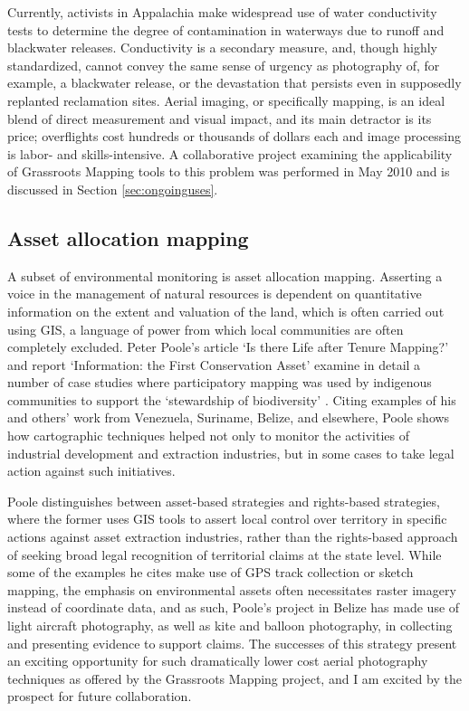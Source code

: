 \documentclass[11pt,oneside,notitlepage]{report}
\begin{document}
{{Currently, activists in Appalachia make widespread use of water conductivity tests to determine the degree of contamination in waterways due to runoff and blackwater releases. Conductivity is a secondary measure, and, though highly standardized, cannot convey the same sense of urgency as photography of, for example, a blackwater release, or the devastation that persists even in supposedly replanted reclamation sites. Aerial imaging, or specifically mapping, is an ideal blend of direct measurement and visual impact, and its main detractor is its price; overflights cost hundreds or thousands of dollars each and image processing is labor- and skills-intensive. A collaborative project examining the applicability of Grassroots Mapping tools to this problem was performed in May 2010 and is discussed in Section \ref{sec:ongoinguses}.

\subsection{Asset allocation mapping}

A subset of environmental monitoring is asset allocation mapping. Asserting a voice in the management of natural resources is dependent on quantitative information on the extent and valuation of the land, which is often carried out using GIS, a language of power from which local communities are often completely excluded. Peter Poole's article `Is there Life after Tenure Mapping?' and report `Information: the First Conservation Asset' examine in detail a number of case studies where participatory mapping was used by indigenous communities to support the `stewardship of biodiversity' \cite{poole2007belize}. Citing examples of his and others' work from Venezuela, Suriname, Belize, and elsewhere, Poole shows how cartographic techniques helped not only to monitor the activities of industrial development and extraction industries, but in some cases to take legal action against such initiatives.  

Poole distinguishes between asset-based strategies and rights-based strategies, where the former uses \ac{GIS} tools to assert local control over territory in specific actions against asset extraction industries, rather than the rights-based approach of seeking broad legal recognition of territorial claims at the state level. \cite{poole2006there} While some of the examples he cites make use of GPS track collection or sketch mapping, the emphasis on environmental assets often necessitates raster imagery instead of coordinate data, and as such, Poole's project in Belize has made use of light aircraft photography, as well as kite and balloon photography, in collecting and presenting evidence to support claims. \cite{poole2007belize} The successes of this strategy present an exciting opportunity for such dramatically lower cost aerial photography techniques as offered by the Grassroots Mapping project, and I am excited by the prospect for future collaboration.

}}
\end{document}
